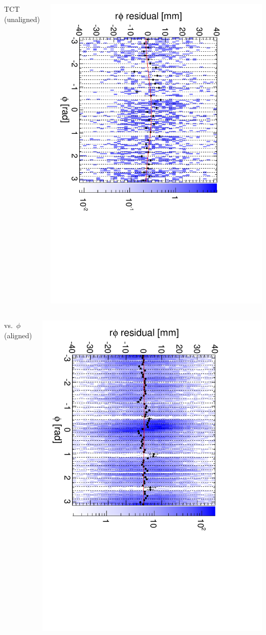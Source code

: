 \documentclass[compress]{beamer}
\begin{document}
\begin{frame}
\begin{columns}
\centering TCT (unaligned)

\includegraphics[height=\linewidth, angle=90]{diskiter01_m2to1inner_TST.pdf}
\end{columns}

\begin{columns}
\centering vs.\ $\phi$ (aligned)

\includegraphics[height=\linewidth, angle=90]{diskiter02_m2to1inner.pdf}


\end{columns}
\end{frame}
\end{document}
